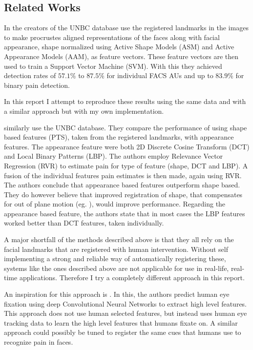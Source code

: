 \documentclass[Main]{subfiles}
\begin{document}


	\subsection{Related Works} %
		\label{sub:related_works}	
		In \cite{Lucey2011} the creators of the UNBC database use the registered landmarks in the images to make procrustes aligned representations of the faces along with facial appearance, shape normalized using Active Shape Models (ASM) and Active Appearance Models (AAM), as feature vectors.
		These feature vectors are then used to train a Support Vector Machine (SVM).
		With this they achieved detection rates of $57.1\%$ to $87.5\%$ for individual FACS AUs and up to $83.9\%$ for binary pain detection.

		In this report I attempt to reproduce these results using the same data and with a similar approach but with my own implementation.

		\citet{Kaltwang2012} similarly use the UNBC database.
		They compare the performance of using shape based features (PTS), taken from the registered landmarks, with appearance features.
		The appearance feature were both 2D Discrete Cosine Transform (DCT) and Local Binary Patterns (LBP).
		The authors employ Relevance Vector Regression (RVR) to estimate pain for type of feature (shape, DCT and LBP).
		A fusion of the individual features pain estimates is then made, again using RVR.
		The authors conclude that appearance based features outperform shape based.
		They do however believe that improved registration of shape, that compensates for out of plane motion (eg. \cite{Rudovic2011}), would improve performance.
		Regarding the appearance based feature, the authors state that in most cases the LBP features worked better than DCT features, taken individually.

		A major shortfall of the methods described above is that they all rely on the facial landmarks that are registered with human intervention.
		Without self implementing a strong and reliable way of automatically registering these, systems like the ones described above are not applicable for use in real-life, real-time applications.
		Therefore I try a completely different approach in this report.

		An inspiration for this approach is \cite{Shen2012a}.
		In this, the authors predict human eye fixation using deep Convolutional Neural Networks to extract high level features. 
		This approach does not use human selected features, but instead uses human eye tracking data to learn the high level features that humans fixate on.
		A similar approach could possibly be tuned to register the same cues that humans use to recognize pain in faces.
\end{document}
